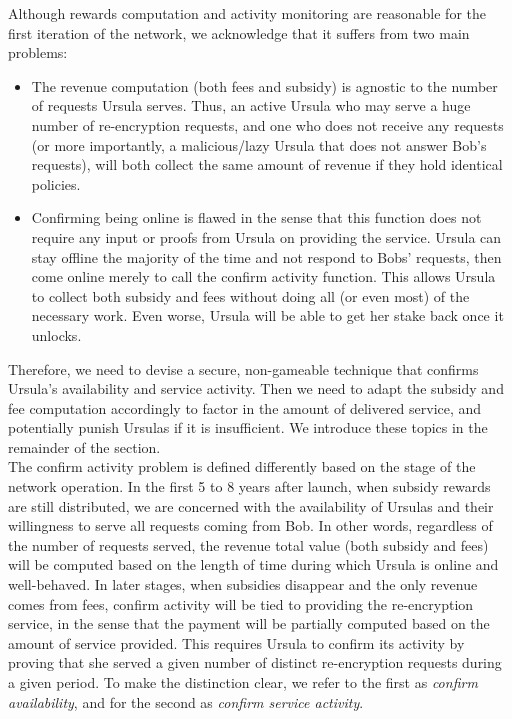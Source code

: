 \documentclass{llncs}
\begin{document}
Although rewards computation and activity monitoring are reasonable for the first iteration of the network, we acknowledge that it suffers from two main problems:
\begin{itemize}
\setlength{\itemsep}{0pt}
\item The revenue computation (both fees and subsidy) is agnostic to the number of requests Ursula serves. Thus, an active Ursula who may serve a huge number of re-encryption requests, and one who does not receive any requests (or more importantly, a malicious/lazy Ursula that does not answer Bob's requests), will both collect the same amount of revenue if they hold identical policies.

\item Confirming being online is flawed in the sense that this function does not require any input or proofs from Ursula on providing the service. Ursula can stay offline the majority of the time and not respond to Bobs' requests, then come online merely to call the confirm activity function. This allows Ursula to collect both subsidy and fees without doing all (or even most) of the necessary work. Even worse, Ursula will be able to get her stake back once it unlocks.
\end{itemize}


Therefore, we need to devise a secure, non-gameable technique that confirms Ursula's availability and service activity. Then we need to adapt the subsidy and fee computation accordingly to factor in the amount of delivered service, and potentially punish Ursulas if it is insufficient. We introduce these topics in the remainder of the section. \\


 The confirm activity problem is defined differently based on the stage of the network operation. In the first 5 to 8 years after launch, when subsidy rewards are 
still distributed, we are concerned with the availability of Ursulas and their willingness to 
serve all requests coming from Bob. In other words, regardless of the number of requests served, the revenue total value (both subsidy and fees) will be computed based on the length of time during which Ursula 
is online and well-behaved. In later stages, when subsidies disappear 
and the only revenue comes from fees, confirm activity will be tied to providing the re-encryption 
service, in the sense that the payment will be partially computed based on the amount of 
service provided. This requires Ursula to confirm its activity by proving that she served 
a given number of distinct re-encryption requests during a given period. To make the distinction 
clear, we refer to the first as \emph{confirm availability}, and for the second as \emph{confirm 
service activity}. \\
\end{document}

